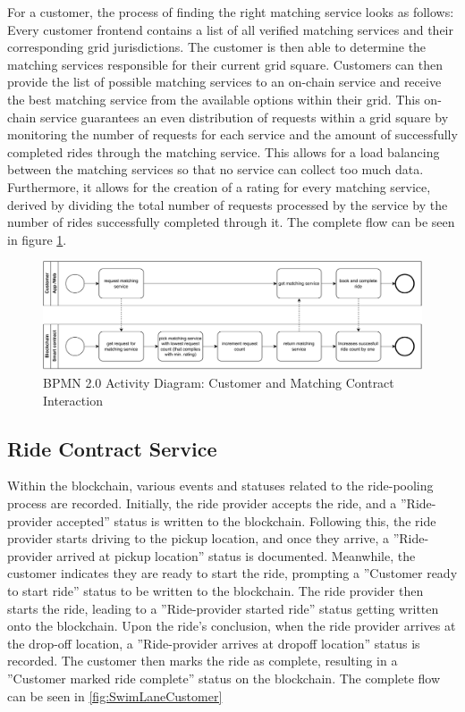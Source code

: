 For a customer, the process of finding the right matching service looks as follows: Every customer frontend contains a list of all verified matching services and their corresponding grid jurisdictions. The customer is then able to determine the matching services responsible for their current grid square.  Customers can then provide the list of possible matching services to an on-chain service and receive the best matching service from the available options within their grid. This on-chain service guarantees an even distribution of requests within a grid square by monitoring the number of requests for each service and the amount of successfully completed rides through the matching service. This allows for a load balancing between the matching services so that no service can collect too much data. Furthermore, it allows for the creation of a rating for every matching service, derived by dividing the total number of requests processed by the service by the number of rides successfully completed through it. The complete flow can be seen in figure \ref{fig:getBestMatchingService}.

\begin{figure}[h]
    \centering
    \includegraphics[width=\linewidth]{data/4.svg}
    \caption{BPMN 2.0 Activity Diagram: Customer and Matching Contract Interaction}
    \label{fig:getBestMatchingService}
\end{figure}


\subsection{Ride Contract Service}\label{subsec:RideContractService}

Within the blockchain, various events and statuses related to the ride-pooling process are recorded. Initially, the ride provider accepts the ride, and a ''Ride-provider accepted'' status is written to the blockchain. Following this, the ride provider starts driving to the pickup location, and once they arrive, a ''Ride-provider arrived at pickup location'' status is documented. Meanwhile, the customer indicates they are ready to start the ride, prompting a ''Customer ready to start ride'' status to be written to the blockchain. The ride provider then starts the ride, leading to a ''Ride-provider started ride'' status getting written onto the blockchain. Upon the ride's conclusion, when the ride provider arrives at the drop-off location, a ''Ride-provider arrives at dropoff location'' status is recorded. The customer then marks the ride as complete, resulting in a ''Customer marked ride complete'' status on the blockchain. The complete flow can be seen in \ref{fig:SwimLaneCustomer}

